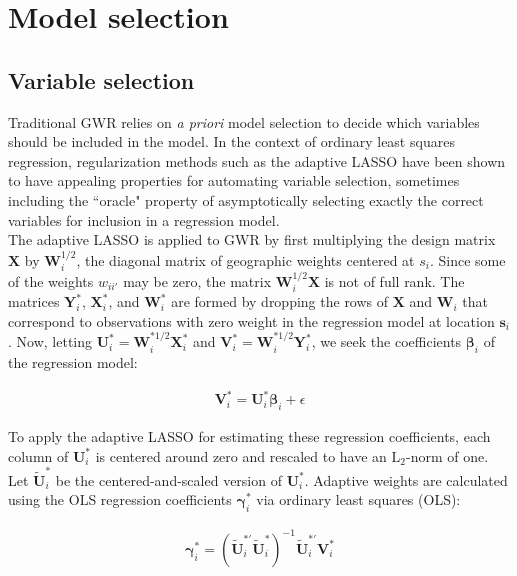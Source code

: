 \documentclass[authoryear, review, 11pt]{elsarticle}
\begin{document}
	
	 
	
\section{Model selection \label{section:model-selection}}
	\subsection{Variable selection}
	Traditional GWR relies on \emph{a priori} model selection to decide which variables should be included in the model. In the context of ordinary least squares regression, regularization methods such as the adaptive LASSO \citep{Zou:2006} have been shown to have appealing properties for automating variable selection, sometimes including the ``oracle" property of asymptotically selecting exactly the correct variables for inclusion in a regression model.\\
	
	The adaptive LASSO is applied to GWR by first multiplying the design matrix $\bm{X}$ by $\bm{W}_i^{1/2}$, the diagonal matrix of geographic weights centered at $s_i$. Since some of the weights $w_{ii'}$ may be zero, the matrix $\bm{W}_i^{1/2}\bm{X}$ is not of full rank. The matrices $\bm{Y}_i^*$, $\bm{X}_i^*$, and $\bm{W}_i^*$ are formed by dropping the rows of $\bm{X}$  and $\bm{W}_i$ that correspond to observations with zero weight in the regression model at location $\bm{s}_i$. Now, letting $\bm{U}_i^* = \bm{W}_i^{*1/2} \bm{X}_i^*$ and $\bm{V}_i^* = \bm{W}_i^{*1/2} \bm{Y}_i^*$, we seek the coefficients $\bm{\beta}_i$ of the regression model:
	
	\begin{eqnarray}
		\bm{V}_i^* = \bm{U}_i^* \bm{\beta}_i + \epsilon
	\end{eqnarray}
	
	To apply the adaptive LASSO for estimating these regression coefficients, each column of $\bm{U}_i^*$ is centered around zero and rescaled to have an $\mbox{L}_2$-norm of one. Let $\widetilde{\bm{U}}_i^*$ be the centered-and-scaled version of $\bm{U}_i^*$. Adaptive weights are calculated using the OLS regression coefficients $\bm{\gamma}_i^*$ via ordinary least squares (OLS):
	
	\begin{eqnarray}\label{eq:adaptive-weights-regression}
		\bm{\gamma}_i^* = \left( \widetilde{\bm{U}}_i^{*'} \widetilde{\bm{U}}_i^* \right)^{-1} \widetilde{\bm{U}}_i^{*'} \bm{V}_i^*
	\end{eqnarray}
	
\end{document}
